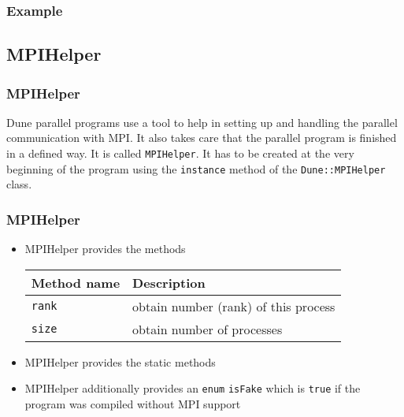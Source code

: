 \begin{frame}
  \frametitle{Example}

\end{frame}
\subsection{MPIHelper}
\begin{frame}[fragile]
  \frametitle<presentation>{MPIHelper}
  Dune parallel programs use a tool to help in setting up and handling the
parallel communication with MPI. It also takes care that the parallel program
is finished in a defined way. It is called \lstinline!MPIHelper!. It has to be
created at the very beginning of the program
using the \lstinline!instance! method of the \lstinline!Dune::MPIHelper! class.


\end{frame}

\begin{frame}[fragile]
  \frametitle<presentation>{MPIHelper}
  \begin{itemize}
  \item MPIHelper provides the methods\medskip

    \begin{tabular}{l|l}
      \hline
      Method name & Description\\\hline
      \lstinline!rank! & obtain number (rank) of this process\\
      \lstinline!size! & obtain number of processes \\
      \hline
    \end{tabular}\medskip
  \item MPIHelper provides the static methods\medskip

    \medskip
   \item MPIHelper additionally provides an \lstinline!enum! \lstinline!isFake! which is \lstinline!true! if the program was compiled
without MPI support
 \end{itemize}
\end{frame}


